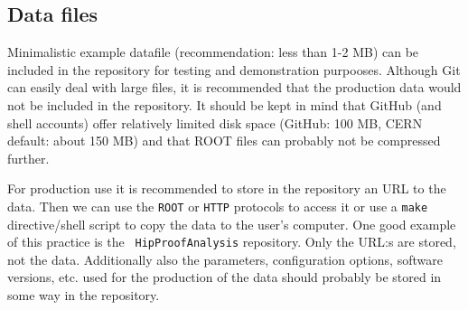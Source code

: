 \begin{appendix}
%


%

%

%



\section{Data files}
Minimalistic example datafile (recommendation: less than 1-2 MB) can
be included in the repository for testing and demonstration
purpooses. Although Git can easily deal with large files, it is
recommended that the production data would not be
included in the repository. It should be kept in mind that GitHub
(and shell accounts) offer relatively limited disk space (GitHub: 100
MB, CERN default: about 150 MB) and that ROOT files can probably not be
compressed further.

For production use it is recommended to store in the repository an URL
to the data. Then we can use the {\tt ROOT} or {\tt HTTP} protocols to
access it or use a {\tt make} directive/shell script to copy the data to the
user's computer. One good example of this practice is the {\tt
HipProofAnalysis} repository. Only the URL:s are stored, not the
data. Additionally also the parameters, configuration options,
software versions, etc. used for the production of the data should
probably be stored in some way in the repository.


\end{appendix}
